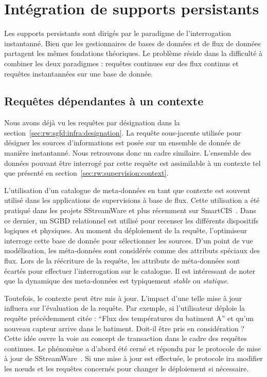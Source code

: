 \section{Intégration de supports persistants}
Les supports persistants sont dirigés par le paradigme de l'interrogation instantanné. Bien que les gestionnaires de bases de données et de flux de données partagent les mêmes fondations théoriques. Le problème réside dans la difficulté à combiner les deux paradigmes : requêtes continues sur des flux continus et requêtes instantannées sur une base de donnée.

\subsection{Requêtes dépendantes à un contexte}
Nous avons déjà vu les requêtes par désignation dans la section~\ref{sec:rw:sgfd:infra:designation}. La requête sous-jacente utilisée pour désigner les sources d'informations est posée sur un ensemble de donnée de manière instantanné. Nous retrouvons donc un cadre similaire. L'ensemble des données pouvant être interrogé par cette requête est assimilable à un contexte tel que présenté en section~\ref{sec:rw:supervision:context}.

L'utilisation d'un catalogue de meta-données en tant que contexte est souvent utilisé dans les applications de supervisions à base de flux. Cette utilisation a été pratiqué dans les projets SStreamWare et plus récemment sur SmartCIS~\cite{Liu:smartcis}. Dans ce dernier, un SGBD relationnel est utilisé pour recenser les différents dispositifs logiques et physiques. Au moment du déploiement de la requête, l'optimiseur interroge cette base de donnée pour sélectionner les sources. D'un point de vue modélisation, les méta-données sont considérés comme des attributs spéciaux des flux. Lors de la réécriture de la requête, les attributs de méta-données sont écartés pour effectuer l'interrogation sur le catalogue. Il est intéressant de noter que la dynamique des meta-données est typiquement \textit{stable} ou \textit{statique}.

Toutefois, le contexte peut être mis à jour. L'impact d'une telle mise à jour influera sur l'évaluation de la requête. Par exemple, si l'utilisateur déploie la requête précédemment citée : \enquote{Flux des températures du batiment A} et qu'un nouveau capteur arrive dans le batiment. Doit-il être pris en considération ? Cette idée ouvre la voie au concept de transaction dans le cadre des requêtes continues. Le phénomène a d'abord été cerné et répondu par le protocole de mise à jour de SStreamWare~\cite{Gurgen:transaction}. Si une mise à jour est effectuée, le protocole ira modifier les nœuds et les requêtes concernés pour changer le déploiement si nécessaire.

